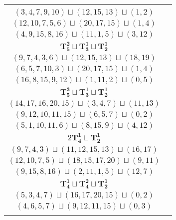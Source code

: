\documentclass{article}
\begin{document}
\begin{longtable}{|c|c|}
\begin{tabular}{c}
        $(2,4,6,9,12)\sqcup(13,14,15)\sqcup(18,19)$ \\ 
        $(3,4,7,9,10)\sqcup(12,15,13)\sqcup(1,2)$ \\ 
        $(12,10,7,5,6)\sqcup(20,17,15)\sqcup(1,4)$ \\ 
        $(4,9,15,8,16)\sqcup(11,1,5)\sqcup(3,12)$
        \end{tabular} \\ 
        \hline
        $\mathbf{T_{5}^{2}} \sqcup \mathbf{T_{3}^{1}} \sqcup \mathbf{T_{2}^{1}}$ & \begin{tabular}{c}
        $(12,9,6,4,11)\sqcup(17,16,15)\sqcup(0,1)$ \\ 
        $(9,7,4,3,6)\sqcup(12,15,13)\sqcup(18,19)$ \\ 
        $(6,5,7,10,3)\sqcup(20,17,15)\sqcup(1,4)$ \\ 
        $(16,8,15,9,12)\sqcup(1,11,2)\sqcup(0,5)$
        \end{tabular} \\ 
        \hline
        $\mathbf{T_{5}^{3}} \sqcup \mathbf{T_{3}^{1}} \sqcup \mathbf{T_{2}^{1}}$ & \begin{tabular}{c}
        $(13,15,16,18,14)\sqcup(9,6,7)\sqcup(2,4)$ \\ 
        $(14,17,16,20,15)\sqcup(3,4,7)\sqcup(11,13)$ \\ 
        $(9,12,10,11,15)\sqcup(6,5,7)\sqcup(0,2)$ \\ 
        $(5,1,10,11,6)\sqcup(8,15,9)\sqcup(4,12)$
        \end{tabular} \\ 
        \hline
        $2\mathbf{T_{4}^{1}} \sqcup \mathbf{T_{2}^{1}}$ & \begin{tabular}{c}
        $(4,6,9,12)\sqcup(16,15,14,13)\sqcup(19,20)$ \\ 
        $(9,7,4,3)\sqcup(11,12,15,13)\sqcup(16,17)$ \\ 
        $(12,10,7,5)\sqcup(18,15,17,20)\sqcup(9,11)$ \\ 
        $(9,15,8,16)\sqcup(2,11,1,5)\sqcup(12,7)$
        \end{tabular} \\ 
        \hline
        $\mathbf{T_{4}^{1}} \sqcup \mathbf{T_{4}^{2}} \sqcup \mathbf{T_{2}^{1}}$ & \begin{tabular}{c}
        $(11,9,6,7)\sqcup(16,15,13,14)\sqcup(1,4)$ \\ 
        $(5,3,4,7)\sqcup(16,17,20,15)\sqcup(0,2)$ \\ 
        $(4,6,5,7)\sqcup(9,12,11,15)\sqcup(0,3)$ \\ 

\end{tabular}
\end{longtable}
\end{document}
